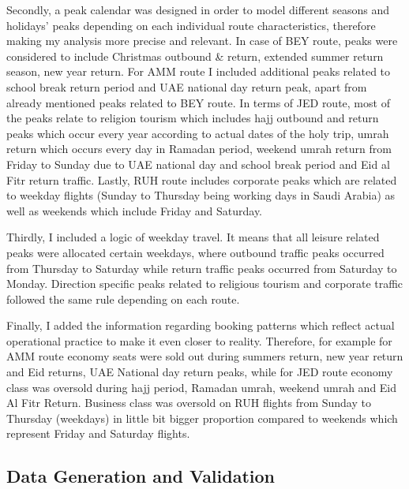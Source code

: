 Secondly, a peak calendar was designed in order to model different seasons and holidays' peaks depending on each individual route characteristics, therefore making my analysis more precise and relevant. In case of BEY route, peaks were considered to include Christmas outbound \& return, extended summer return season, new year return. For AMM route I included additional peaks related to school break return period and UAE national day return peak, apart from already mentioned peaks related to BEY route. In terms of JED route, most of the peaks relate to religion tourism which includes hajj outbound and return peaks which occur every year according to actual dates of the holy trip, umrah return which occurs every day in Ramadan period, weekend umrah return from Friday to Sunday due to UAE national day and school break period and Eid al Fitr return traffic. Lastly, RUH route includes corporate peaks which are related to weekday flights (Sunday to Thursday being working days in Saudi Arabia) as well as weekends which include Friday and Saturday.

Thirdly, I included a logic of weekday travel. It means that all leisure related peaks were allocated certain weekdays, where outbound traffic peaks occurred from Thursday to Saturday while return traffic peaks occurred from Saturday to Monday. Direction specific peaks related to religious tourism and corporate traffic followed the same rule depending on each route.

Finally, I added the information regarding booking patterns which reflect actual operational practice to make it even closer to reality. Therefore, for example for AMM route economy seats were sold out during summers return, new year return and Eid returns, UAE National day return peaks, while for JED route economy class was oversold during hajj period, Ramadan umrah, weekend umrah and Eid Al Fitr Return. Business class was oversold on RUH flights from Sunday to Thursday (weekdays) in little bit bigger proportion compared to weekends which represent Friday and Saturday flights.

\subsection{Data Generation and Validation}

